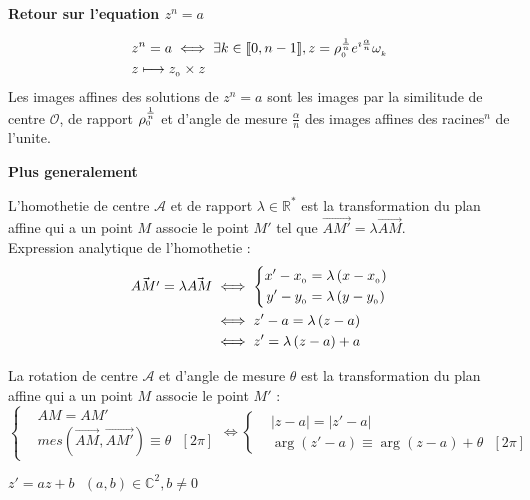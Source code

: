 \documentclass[12pt,twoside,a4paper]{article}
\begin{document}
		\textbf{Retour sur l'equation $z^n=a$}
		\begin{tab}
			$$\begin{aligned}
				&z^n=a\iff\exists k\in[\![0, n-1]\!],z=\rho_{_{0}}^\frac{1}{n}e^{\imath\frac{\alpha}{n}}\omega_{_{k}} \\
				&z\longmapsto z_{_{0}}\times z
			\end{aligned}$$
			Les images affines des solutions de $z^n=a$ sont les images par la similitude de centre $\mathcal{O}$, de rapport $\rho_{_{0}}^\frac{1}{n}$ et d'angle de mesure $\frac{\alpha}{n}$ des images affines des racines$^n$ de l'unite.
		\end{tab}
		\textbf{Plus generalement}
		\begin{liste}
			\item L'homothetie de centre $\mathcal{A}$ et de rapport $\lambda\in\mathbb{R}^*$ est la transformation du plan affine qui a un point $M$ associe le point $M'$ tel que $\vec{AM'}=\lambda\vec{AM}$. \\
				Expression analytique de l'homothetie :
				$$\begin{aligned}
					\vec{AM'}=\lambda\vec{AM}&\iff\left\{\begin{aligned}x'-x_{_{0}}&=\lambda\left(x-x_{_{0}}\right) \\
																		y'-y_{_{0}}&=\lambda\left(y-y_{_{0}}\right)\end{aligned}\right.\\
											 &\iff z'-a=\lambda\left(z-a\right)\\
											 &\iff z'=\lambda\left(z-a\right)+a
				\end{aligned}$$
				\item La rotation de centre $\mathcal{A}$ et d'angle de mesure $\theta$ est la transformation du plan affine qui a un point $M$ associe le point $M'$ : \\
				$$
					\left\{\begin{aligned}&AM=AM'\\
										  &mes\left(\vec{AM}, \vec{AM'}\right)\equiv\theta\ \ \ \left[2\pi\right]\end{aligned}\right.\iff\left\{\begin{aligned}&\left|z-a\right|=\left|z'-a\right| \\
									  																																			  &\arg\left(z'-a\right)\equiv\arg\left(z-a\right)+\theta\ \ \ \left[2\pi\right]\end{aligned}\right.
				$$
			\item $z'=az+b\ \ \ \left(a, b\right)\in\mathbb{C}^2,b\neq0$ \\

\end{liste}
\end{document}
